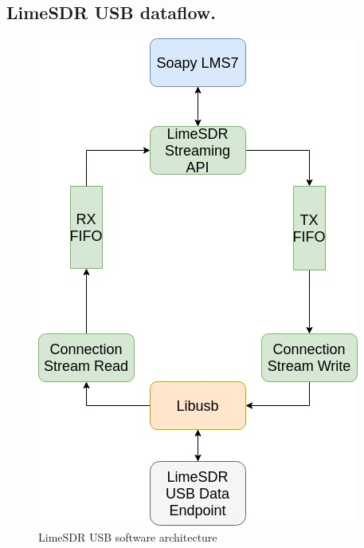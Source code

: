 \subsection{LimeSDR USB dataflow.}
\begin{figure}[h!]
\centering
\includegraphics[scale=0.6]{Figure/Software_Architecture.jpg}
\caption{LimeSDR USB software architecture}
\end{figure}

